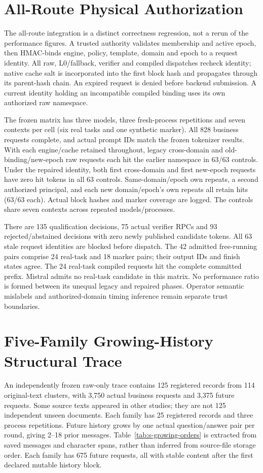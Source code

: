 \section{All-Route Physical Authorization}
\label{sec:s-authorization}
The all-route integration is a distinct correctness regression, not a rerun of the performance figures. A trusted authority validates membership and active epoch, then HMAC-binds engine, policy, template, domain and epoch to a request identity. All raw, L0/fallback, verifier and compiled dispatches recheck identity; native cache salt is incorporated into the first block hash and propagates through its parent-hash chain. An expired request is denied before backend submission. A current identity holding an incompatible compiled binding uses its own authorized raw namespace.

The frozen matrix has three models, three fresh-process repetitions and seven contexts per cell (six real tasks and one synthetic marker). All 828 business requests complete, and actual prompt IDs match the frozen tokenizer results. With each engine/cache retained throughout, legacy cross-domain and old-binding/new-epoch raw requests each hit the earlier namespace in 63/63 controls. Under the repaired identity, both first cross-domain and first new-epoch requests have zero hit tokens in all 63 controls. Same-domain/epoch own repeats, a second authorized principal, and each new domain/epoch's own repeats all retain hits (63/63 each). Actual block hashes and marker coverage are logged. The controls share seven contexts across repeated models/processes.

There are 135 qualification decisions, 75 actual verifier RPCs and 93 rejected/abstained decisions with zero newly published candidate tokens. All 63 stale request identities are blocked before dispatch. The 42 admitted free-running pairs comprise 24 real-task and 18 marker pairs; their output IDs and finish states agree. The 24 real-task compiled requests hit the complete committed prefix. Mistral admits no real-task candidate in this matrix. No performance ratio is formed between its unequal legacy and repaired phases. Operator semantic mislabels and authorized-domain timing inference remain separate trust boundaries.

\section{Five-Family Growing-History Structural Trace}
\label{sec:s-growing-history}
An independently frozen raw-only trace contains 125 registered records from 114 original-text clusters, with 3,750 actual business requests and 3,375 future requests. Some source texts appeared in other studies; they are not 125 independent unseen documents. Each family has 25 registered records and three process repetitions. Future history grows by one actual question/answer pair per round, giving 2--18 prior messages. Table~\ref{tab:s-growing-orders} is extracted from saved messages and character spans, rather than inferred from source-file storage order. Each family has 675 future requests, all with stable content after the first declared mutable history block.


